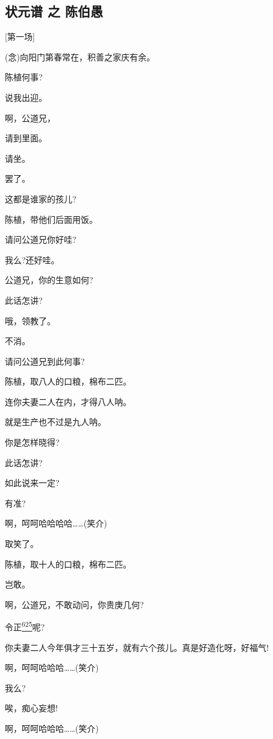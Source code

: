 \newpage
{} %
\hypertarget{ux72b6ux5143ux8c31-ux4e4b-ux9648ux4f2fux611a}{%
\subsection{状元谱 之
陈伯愚}\label{ux72b6ux5143ux8c31-ux4e4b-ux9648ux4f2fux611a}}

{[}第一场{]}

(念)向阳门第春常在，积善之家庆有余。

陈植何事?

说我出迎。

啊，公道兄，

请到里面。

请坐。

罢了。

这都是谁家的孩儿?

陈植，带他们后面用饭。

请问公道兄你好哇?

我么?还好哇。

公道兄，你的生意如何?

此话怎讲?

哦，领教了。

不消。

请问公道兄到此何事?

陈植，取八人的口粮，棉布二匹。

连你夫妻二人在内，才得八人呐。

就是生产也不过是九人呐。

你是怎样晓得?

此话怎讲?

如此说来一定?

有准?

啊，呵呵哈哈哈哈\ldots{}\ldots{}(笑介)

取笑了。

陈植，取十人的口粮，棉布二匹。

岂敢。

啊，公道兄，不敢动问，你贵庚几何?

令正\protect\hyperlink{fn625}{\textsuperscript{625}}呢?

你夫妻二人今年俱才三十五岁，就有六个孩儿。真是好造化呀，好福气!

啊，呵呵哈哈哈\ldots{}\ldots{}(笑介)

我么?

唉，痴心妄想!

啊，呵呵哈哈哈\ldots{}\ldots{}(笑介)

